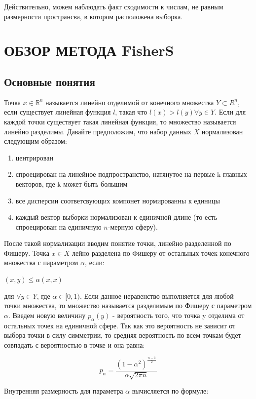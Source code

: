 \documentclass[english, russian]{sobraep}
\begin{document}
Действительно, можем наблюдать факт сходимости к числам, не равным размерности пространсва, в котором расположена выборка.

\section{ОБЗОР МЕТОДА FisherS}

\subsection{Основные понятия}
Точка $x \in \mathbb {R}^n$ называется линейно отделимой от конечного множества $Y \subset {R}^n$, если существует линейная функция $l$, такая что $l(x) > l(y) \forall y \in Y$. Если для каждой точки существует такая линейная функция, то множество называется линейно разделимы.
Давайте предположим, что набор данных $X$ нормализован следующим образом:
\begin{enumerate}
    \item центрирован
    \item спроецирован на линейное подпространство, натянутое на первые k главных векторов, где k может быть большим
    \item все дисперсии соответсвующих компонет нормированны к единицы
    \item каждый вектор выборки нормализован к единичной длине (то есть спроецирован на единичную $n$-мерную сферу).
\end{enumerate}
После такой нормализации вводим понятие точки, линейно разделенной по Фишеру. Точка $x \in X$ лейно разделена по Фишеру от остальных точек конечного множества с параметром $\alpha$, если:
\begin{center}
    $(x,y) \leq \alpha(x,x)$
\end{center}
для $\forall y \in Y$, где $\alpha \in [0, 1)$. Если данное неравенство выполняется для любой точки множества, то множество называется разделимым по Фишеру с параметром $\alpha$.
Введем новую величину $p_\alpha(y)$ - вероятность того, что точка y отделима от остальных точек на единичной сфере. Так как это вероятность не зависит от выбора точки в силу симметрии, то средняя вероятность по всем точкам будет совпадать с вероятностью в точке и она равна:

\begin{equation}
    p_\alpha = \frac{(1 - \alpha^2)^{\frac{n - 1}{2}}}{\alpha\sqrt{2\pi n}}
\end{equation}

Внутренняя размерность для параметра $\alpha$ вычисляется по формуле:
\end{document}
